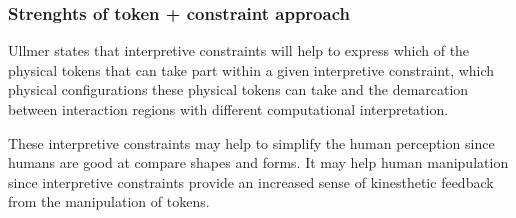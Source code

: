 \subsubsection{Strenghts of token + constraint approach}
Ullmer states that interpretive constraints will help to express which of the physical tokens that can take part within a given interpretive constraint, which physical configurations these physical tokens can take and the demarcation between interaction regions with different computational interpretation.

These interpretive constraints may help to simplify the human perception since humans are good at compare shapes and forms. 
It may help human manipulation since interpretive constraints provide an increased sense of kinesthetic feedback from the manipulation of tokens. 

